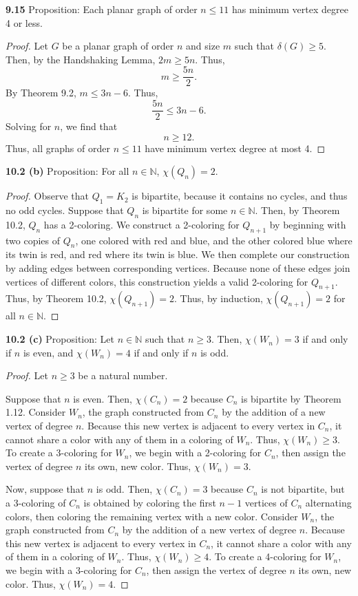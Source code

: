 \documentclass[12pt]{article}
\begin{document}
\newpage
\medskip\noindent\textbf{9.15} Proposition: Each planar graph of order $n \leq 11$ has minimum vertex degree 4 or less.
\begin{proof}
    Let $G$ be a planar graph of order $n$ and size $m$ such that $\delta(G) \geq 5$.
    Then, by the Handshaking Lemma, $2m \geq 5n$.
    Thus, $$m \geq \frac{5n}2.$$
    By Theorem 9.2, $m \leq 3n - 6.$
    Thus, $$\frac{5n}2\leq 3n-6.$$
    Solving for $n$, we find that $$n \geq 12.$$
    Thus, all graphs of order $n \leq 11$ have minimum vertex degree at most 4.
\end{proof}

\newpage
\medskip\noindent\textbf{10.2 (b)} Proposition: For all $n \in \mathbb N$, $\chi(Q_n) = 2$.
\begin{proof}
    Observe that $Q_1 = K_2$ is bipartite, because it contains no cycles, and thus no odd cycles.
    Suppose that $Q_{n}$ is bipartite for some $n \in \mathbb N$.
    Then, by Theorem 10.2, $Q_{n}$ has a 2-coloring.
    We construct a 2-coloring for $Q_{n+1}$ by beginning with two copies of $Q_n$, one colored with red and blue, and the other colored blue where its twin is red, and red where its twin is blue.
    We then complete our construction by adding edges between corresponding vertices.
    Because none of these edges join vertices of different colors, this construction yields a valid 2-coloring for $Q_{n+1}$.
    Thus, by Theorem 10.2, $\chi(Q_{n+1}) = 2$.
    Thus, by induction, $\chi(Q_{n+1}) = 2$ for all $n \in \mathbb N$.
\end{proof}

\medskip\noindent\textbf{10.2 (c)} Proposition: Let $n \in \mathbb N$ such that $n \geq 3$. Then, $\chi(W_n) = 3$ if and only if $n$ is even, and $\chi(W_n) = 4$ if and only if $n$ is odd.
\begin{proof}
    Let $n \geq 3$ be a natural number.
    
    Suppose that $n$ is even.
    Then, $\chi(C_n) = 2$ because $C_n$ is bipartite by Theorem 1.12.
    Consider $W_n$, the graph constructed from $C_n$ by the addition of a new vertex of degree $n$.
    Because this new vertex is adjacent to every vertex in $C_n$, it cannot share a color with any of them in a coloring of $W_n$.
    Thus, $\chi(W_n) \geq 3$.
    To create a 3-coloring for $W_n$, we begin with a 2-coloring for $C_n$, then assign the vertex of degree $n$ its own, new color.
    Thus, $\chi(W_n) = 3$.

    Now, suppose that $n$ is odd.
    Then, $\chi(C_n) = 3$ because $C_n$ is not bipartite, but a 3-coloring of $C_n$ is obtained by coloring the first ${n-1}$ vertices of $C_n$ alternating colors, then coloring the remaining vertex with a new color.
    Consider $W_n$, the graph constructed from $C_n$ by the addition of a new vertex of degree $n$.
    Because this new vertex is adjacent to every vertex in $C_n$, it cannot share a color with any of them in a coloring of $W_n$.
    Thus, $\chi(W_n) \geq 4$.
    To create a 4-coloring for $W_n$, we begin with a 3-coloring for $C_n$, then assign the vertex of degree $n$ its own, new color.
    Thus, $\chi(W_n) = 4$.

\end{proof}
\end{document}
